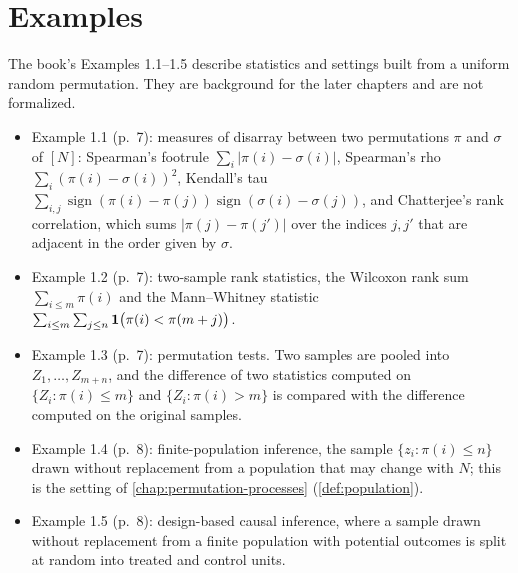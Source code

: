 \section{Examples}

\begin{remark}
  The book's Examples 1.1--1.5 describe statistics and settings built from a uniform random permutation. They are background for the later chapters and are not formalized.
  \begin{itemize}
    \item Example 1.1 (p.~7): measures of disarray between two permutations $\pi$ and $\sigma$ of $[N]$: Spearman's footrule $\sum_i|\pi(i)-\sigma(i)|$, Spearman's rho $\sum_i(\pi(i)-\sigma(i))^2$, Kendall's tau $\sum_{i,j}\operatorname{sign}(\pi(i)-\pi(j))\operatorname{sign}(\sigma(i)-\sigma(j))$, and Chatterjee's rank correlation, which sums $|\pi(j)-\pi(j')|$ over the indices $j,j'$ that are adjacent in the order given by $\sigma$.
    \item Example 1.2 (p.~7): two-sample rank statistics, the Wilcoxon rank sum $\sum_{i\le m}\pi(i)$ and the Mann--Whitney statistic $\sum_{i\le m}\sum_{j\le n}\mathbf{1}\bigl(\pi(i)<\pi(m+j)\bigr)$.
    \item Example 1.3 (p.~7): permutation tests. Two samples are pooled into $Z_1,\dots,Z_{m+n}$, and the difference of two statistics computed on $\{Z_i:\pi(i)\le m\}$ and $\{Z_i:\pi(i)>m\}$ is compared with the difference computed on the original samples.
    \item Example 1.4 (p.~8): finite-population inference, the sample $\{z_i:\pi(i)\le n\}$ drawn without replacement from a population that may change with $N$; this is the setting of \cref{chap:permutation-processes} (\cref{def:population}).
    \item Example 1.5 (p.~8): design-based causal inference, where a sample drawn without replacement from a finite population with potential outcomes is split at random into treated and control units.
  \end{itemize}
\end{remark}
